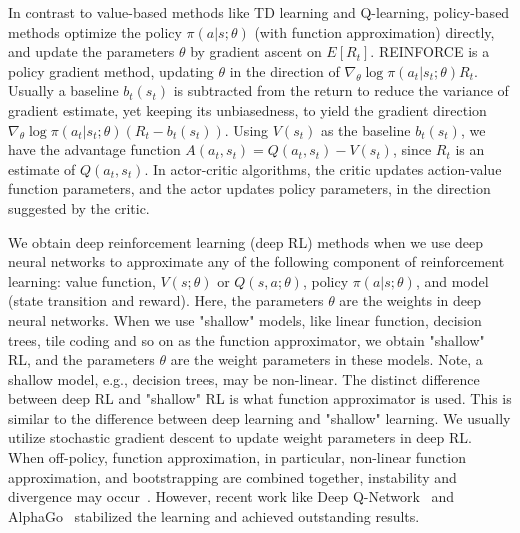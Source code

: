 
In contrast to value-based methods like TD learning and Q-learning, policy-based methods optimize the policy $\pi(a|s; \theta)$ (with function approximation) directly, and update the parameters $\theta$ by gradient ascent on $E[R_t]$. REINFORCE is a policy gradient method, updating $\theta$ in the direction of $\nabla_{\theta} \log \pi(a_t|s_t; \theta) R_t$. Usually a baseline $b_t(s_t)$ is subtracted from the return to reduce the variance of gradient estimate, yet keeping its unbiasedness, to yield the gradient direction $\nabla_{\theta} \log \pi(a_t|s_t; \theta) (R_t - b_t(s_t))$. Using $V(s_t)$ as the baseline $b_t(s_t)$, we have the advantage function $A(a_t, s_t) = Q(a_t, s_t) - V(s_t)$, since $R_t$ is an estimate of $Q(a_t, s_t)$. In actor-critic algorithms, the critic updates action-value function parameters, and the actor updates policy parameters, in the direction suggested by the critic.

We obtain deep reinforcement learning (deep RL) methods when we use deep neural networks to approximate any of the following component of reinforcement learning: value function, $V(s; \theta)$ or $Q(s,a; \theta)$, policy $\pi(a|s; \theta)$, and model (state transition and reward). Here, the parameters $\theta$ are the weights in deep neural networks. When we use "shallow" models, like linear function, decision trees, tile coding and so on as the function approximator, we obtain "shallow" RL, and the parameters $\theta$ are the weight parameters in these models. Note, a shallow model, e.g., decision trees, may be non-linear. The distinct difference between deep RL and "shallow" RL is what function approximator is used. This is similar to the difference between deep learning and "shallow" learning. We usually utilize stochastic gradient descent to update weight parameters in deep RL. When off-policy, function approximation, in particular, non-linear function approximation, and bootstrapping are combined together, instability and divergence may occur~\citep{TDWithApproximator}. However, recent work like Deep Q-Network~\citep{Atari} and AlphaGo~\citep{AlphaGo} stabilized the learning and achieved outstanding results.

